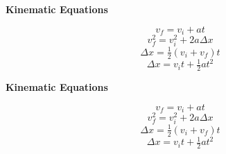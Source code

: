 \documentclass{article}
\begin{document}
\begin{minipage}{.5\textwidth}
\Large{\textbf{Kinematic Equations}} \\
\begin{large}
	\[v_f = v_i + at\]\vspace{-6pt}
	\[v_f^2 = v_i^2 + 2a \Delta x\]\vspace{-6pt}
	\[\Delta x = \tfrac{1}{2}(v_i + v_f)t\]\vspace{-6pt}
	\[\Delta x = v_i t + \tfrac{1}{2} at^2\]
\end{large}
\end{minipage}
\begin{minipage}{.5\textwidth}
\Large{\textbf{Kinematic Equations}} \\
\begin{large}
	\[v_f = v_i + at\]\vspace{-6pt}
	\[v_f^2 = v_i^2 + 2a \Delta x\]\vspace{-6pt}
	\[\Delta x = \tfrac{1}{2}(v_i + v_f)t\]\vspace{-6pt}
	\[\Delta x = v_i t + \tfrac{1}{2} at^2\]
\end{large}
\end{minipage}
\end{document}
